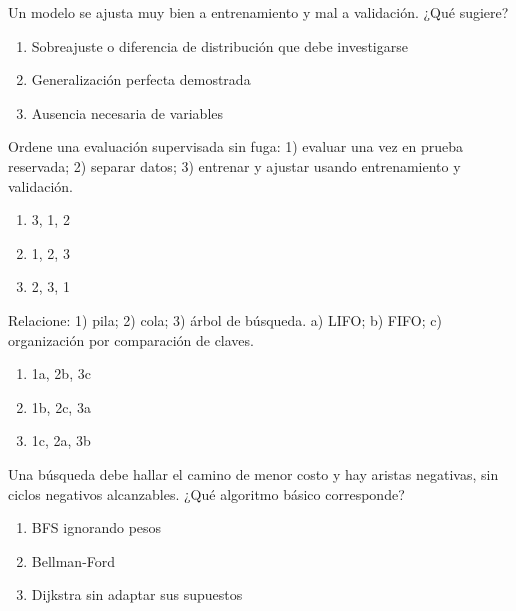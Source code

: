 \noindent\begin{minipage}{\linewidth}\setlength{\parskip}{4pt}\label{q:S-090}
Un modelo se ajusta muy bien a entrenamiento y mal a validación. ¿Qué sugiere?
\begin{enumerate}[label=\Alph*),nosep]
\item Sobreajuste o diferencia de distribución que debe investigarse
\item Generalización perfecta demostrada
\item Ausencia necesaria de variables
\end{enumerate}\end{minipage}\par\medskip

\noindent\begin{minipage}{\linewidth}\setlength{\parskip}{4pt}\label{q:S-091}
Ordene una evaluación supervisada sin fuga: 1) evaluar una vez en prueba reservada; 2) separar datos; 3) entrenar y ajustar usando entrenamiento y validación.
\begin{enumerate}[label=\Alph*),nosep]
\item 3, 1, 2
\item 1, 2, 3
\item 2, 3, 1
\end{enumerate}\end{minipage}\par\medskip

\noindent\begin{minipage}{\linewidth}\setlength{\parskip}{4pt}\label{q:S-092}
Relacione: 1) pila; 2) cola; 3) árbol de búsqueda. a) LIFO; b) FIFO; c) organización por comparación de claves.
\begin{enumerate}[label=\Alph*),nosep]
\item 1a, 2b, 3c
\item 1b, 2c, 3a
\item 1c, 2a, 3b
\end{enumerate}\end{minipage}\par\medskip

\noindent\begin{minipage}{\linewidth}\setlength{\parskip}{4pt}\label{q:S-093}
Una búsqueda debe hallar el camino de menor costo y hay aristas negativas, sin ciclos negativos alcanzables. ¿Qué algoritmo básico corresponde?
\begin{enumerate}[label=\Alph*),nosep]
\item BFS ignorando pesos
\item Bellman-Ford
\item Dijkstra sin adaptar sus supuestos
\end{enumerate}\end{minipage}\par\medskip

